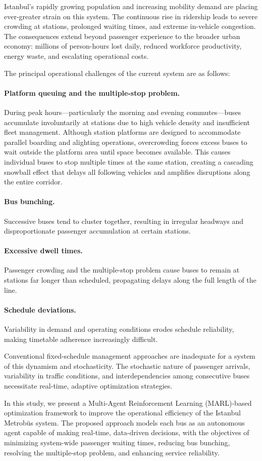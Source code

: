 \documentclass[a4paper,10pt,twocolumn]{article}
\begin{document}
Istanbul's rapidly growing population and increasing mobility demand are placing ever-greater strain on this system. The continuous rise in ridership leads to severe crowding at stations, prolonged waiting times, and extreme in-vehicle congestion. The consequences extend beyond passenger experience to the broader urban economy: millions of person-hours lost daily, reduced workforce productivity, energy waste, and escalating operational costs.

The principal operational challenges of the current system are as follows:

\paragraph{Platform queuing and the multiple-stop problem.}
During peak hours---particularly the morning and evening commutes---buses accumulate involuntarily at stations due to high vehicle density and insufficient fleet management. Although station platforms are designed to accommodate parallel boarding and alighting operations, overcrowding forces excess buses to wait outside the platform area until space becomes available. This causes individual buses to stop multiple times at the same station, creating a cascading snowball effect that delays all following vehicles and amplifies disruptions along the entire corridor.

\paragraph{Bus bunching.}
Successive buses tend to cluster together, resulting in irregular headways and disproportionate passenger accumulation at certain stations.

\paragraph{Excessive dwell times.}
Passenger crowding and the multiple-stop problem cause buses to remain at stations far longer than scheduled, propagating delays along the full length of the line.

\paragraph{Schedule deviations.}
Variability in demand and operating conditions erodes schedule reliability, making timetable adherence increasingly difficult.

Conventional fixed-schedule management approaches are inadequate for a system of this dynamism and stochasticity. The stochastic nature of passenger arrivals, variability in traffic conditions, and interdependencies among consecutive buses necessitate real-time, adaptive optimization strategies.

In this study, we present a Multi-Agent Reinforcement Learning (MARL)-based optimization framework to improve the operational efficiency of the Istanbul Metrob\"{u}s system. The proposed approach models each bus as an autonomous agent capable of making real-time, data-driven decisions, with the objectives of minimizing system-wide passenger waiting times, reducing bus bunching, resolving the multiple-stop problem, and enhancing service reliability.
\end{document}
